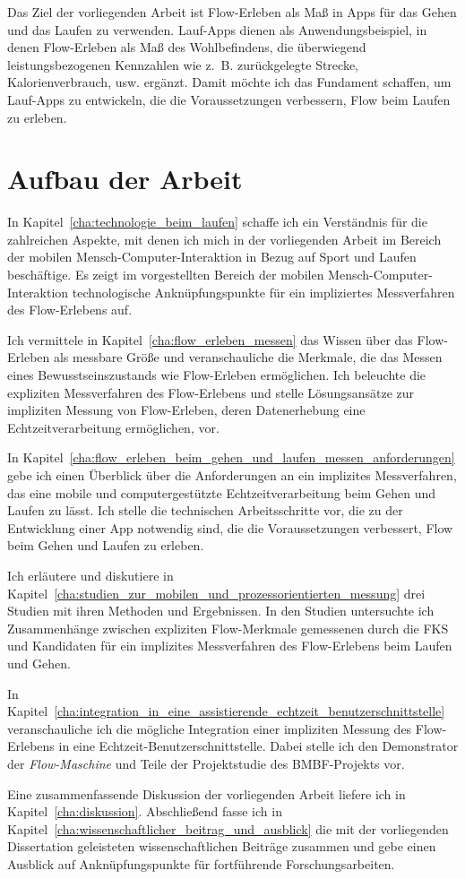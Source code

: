 Das Ziel der vorliegenden Arbeit ist Flow-Erleben als Maß in Apps für das Gehen und das Laufen zu verwenden. Lauf-Apps dienen als Anwendungsbeispiel, in denen Flow-Erleben als Maß des Wohlbefindens, die überwiegend leistungsbezogenen Kennzahlen wie z.~B. zurückgelegte Strecke, Kalorienverbrauch, usw. ergänzt. Damit möchte ich das Fundament schaffen, um Lauf-Apps zu entwickeln, die die Voraussetzungen verbessern, Flow beim Laufen zu erleben.

\section{Aufbau der Arbeit}

In Kapitel~\ref{cha:technologie_beim_laufen} schaffe ich ein Verständnis für die zahlreichen Aspekte, mit denen ich mich in der vorliegenden Arbeit im Bereich der mobilen Mensch-Computer-Interaktion in Bezug auf Sport und Laufen beschäftige. Es zeigt im vorgestellten Bereich der mobilen Mensch-Computer-Interaktion technologische Anknüpfungspunkte für ein impliziertes Messverfahren des Flow-Erlebens auf.

Ich vermittele in Kapitel~\ref{cha:flow_erleben_messen} das Wissen über das Flow-Erleben als messbare Größe und veranschauliche die Merkmale, die das Messen eines Bewusstseinszustands wie Flow-Erleben ermöglichen. Ich beleuchte die expliziten Messverfahren des Flow-Erlebens und stelle Lösungsansätze zur impliziten Messung von Flow-Erleben, deren Datenerhebung eine Echtzeitverarbeitung ermöglichen, vor.

In Kapitel~\ref{cha:flow_erleben_beim_gehen_und_laufen_messen_anforderungen} gebe ich einen Überblick über die Anforderungen an ein implizites Messverfahren, das eine mobile und computergestützte Echtzeitverarbeitung beim Gehen und Laufen zu lässt. Ich stelle die technischen Arbeitsschritte vor, die zu der Entwicklung einer App notwendig sind, die die Voraussetzungen verbessert, Flow beim Gehen und Laufen zu erleben.

Ich erläutere und diskutiere in Kapitel~\ref{cha:studien_zur_mobilen_und_prozessorientierten_messung} drei Studien mit ihren Methoden und Ergebnissen. In den Studien untersuchte ich Zusammenhänge zwischen expliziten Flow-Merkmale gemessenen durch die \ac{FKS} und Kandidaten für ein implizites Messverfahren des Flow-Erlebens beim Laufen und Gehen.

In Kapitel~\ref{cha:integration_in_eine_assistierende_echtzeit_benutzerschnittstelle} veranschauliche ich die mögliche Integration einer impliziten Messung des Flow-Erlebens in eine Echtzeit-Benutzerschnittstelle. Dabei stelle ich den Demonstrator der \emph{Flow-Maschine} und Teile der Projektstudie des \acs{BMBF}-Projekts vor.

Eine zusammenfassende Diskussion der vorliegenden Arbeit liefere ich in Kapitel~\ref{cha:diskussion}. Abschließend fasse ich in Kapitel~\ref{cha:wissenschaftlicher_beitrag_und_ausblick} die mit der vorliegenden Dissertation geleisteten wissenschaftlichen Beiträge zusammen und gebe einen Ausblick auf Anknüpfungspunkte für fortführende Forschungsarbeiten.
